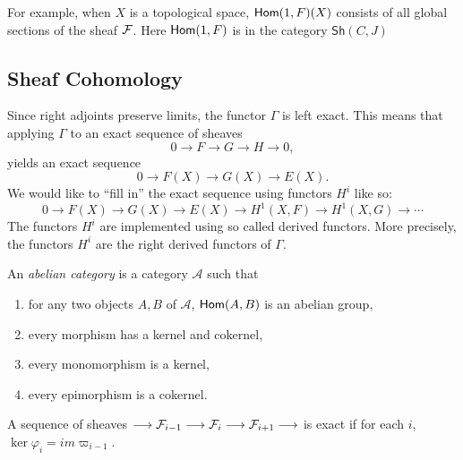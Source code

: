 For example, when $X$ is a topological space, $\mathsf{Hom}(1,F)(X)$ consists of all global sections of the sheaf $\mathcal{F}$. Here $\mathsf{Hom}(1,F)$ is in the category $\mathsf{Sh}(C,J)$

\subsection{Sheaf Cohomology}
Since right adjoints preserve limits, the functor $\Gamma$ is left exact. This means that applying $\Gamma$ to an exact sequence of sheaves 
\[0 \to F \to G \to H \to 0,\]
yields an exact sequence
\[0 \to F(X) \to G(X) \to E(X).\]
We would like to ``fill in'' the exact sequence using functors $H^i$ like so:
\[0 \to F(X) \to G(X) \to E(X) \to H^1(X, F) \to H^1(X,G) \to\cdots \]
The functors $H^i$ are implemented using so called derived functors. More precisely, the functors $H^i$ are the right derived functors of $\Gamma$.

\begin{remark}
	An \textit{abelian category} is a category $\mathcal{A}$ such that
	\begin{enumerate}
		\item for any two objects $A,B$ of $\mathcal{A}$, $\mathsf{Hom}(A,B)$ is an abelian group,
		\item every morphism has a kernel and cokernel,
		\item every monomorphism is a kernel,
		\item every epimorphism is a cokernel.
	\end{enumerate}
\end{remark}

\begin{definition}
  A sequence of sheaves $\longrightarrow \mathcal{F}_{i-1} \longrightarrow \mathcal{F}_{i} \longrightarrow \mathcal{F}_{i+1} \longrightarrow$
	is exact if for each $i$, $\ker \varphi_i = im \varpi_{i-1}$.
\end{definition}

